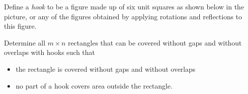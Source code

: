 Define a \emph{hook} to be a figure made up of six unit squares as shown below in the picture, or any of the figures obtained by applying rotations and reflections to this figure.

\begin{center}
\end{center}

Determine all $ m\times n$ rectangles that can  be covered without gaps and without overlaps with hooks such that

\begin{itemize}
	\item the rectangle is covered without gaps and without overlaps
	\item no part of a hook covers area outside the rectangle.
\end{itemize}
